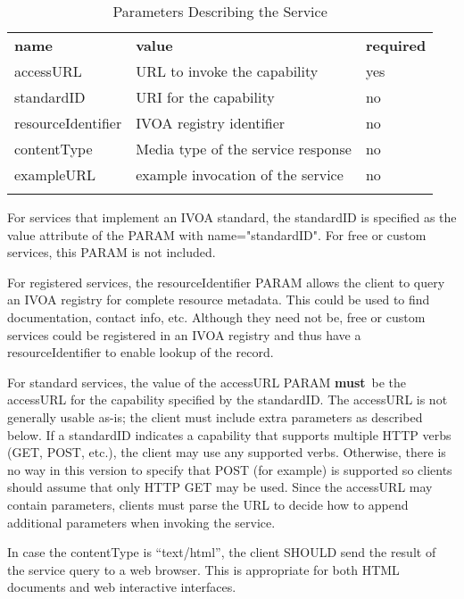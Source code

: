 \documentclass[11pt,a4paper]{ivoa}
\newcommand{\attval}[2]{#1={\allowbreak}{"}#2{"}}
\newcommand{\rfcmust}{\textbf{must}}
\begin{document}
\begin{table}[h]
\begin{center}
\begin{tabular}{|l|l|l|}
\sptablerule
{\bf name}          &  {\bf value}                          & {\bf required}  \\
\sptablerule
accessURL           & URL to invoke the capability          &  yes  \\
standardID          & URI for the capability                &  no   \\
resourceIdentifier  & IVOA registry identifier              &  no   \\
contentType	        & Media type of the service response    & no \\
exampleURL          & example invocation of the service     & no \\
\sptablerule
\end{tabular}
\end{center}
\caption{Parameters Describing the Service}
\label{tab:serviceParams}
\end{table}

For services that implement an IVOA standard, the standardID is specified
as the value attribute of the PARAM with \attval{name}{standardID}.
For free or custom services, this PARAM is not included.

For registered services, the resourceIdentifier PARAM allows the client
to query an IVOA registry for complete resource metadata. This could be
used to find documentation, contact info, etc. Although they need not be,
free or custom services could be registered in an IVOA registry and thus
have a resourceIdentifier to enable lookup of the record.

For standard services, the value of the accessURL PARAM \rfcmust\ be the
accessURL for the capability specified by the standardID. The accessURL
is not generally usable as-is; the client must include extra parameters
as described below. If a standardID indicates a capability that supports
multiple HTTP verbs (GET, POST, etc.), the client may use any supported
verbs. Otherwise, there is no way in this version to specify that POST
(for example) is supported so clients should assume that only HTTP GET
may be used. Since the accessURL may contain parameters, clients must
parse the URL to decide how to append additional parameters when
invoking the service.

In case the contentType is ``text/html'', the client SHOULD send the result 
of the service query to a web browser.  This is appropriate for both HTML
documents and web interactive interfaces. 
 
\end{document}
